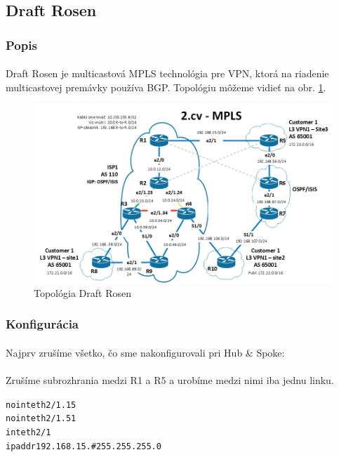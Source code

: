 \documentclass[12pt,twoside,a4paper]{report}
\begin{document}
\subsection{Draft Rosen}
\subsubsection{Popis}
\paragraph{}
Draft Rosen je multicastová MPLS technológia pre VPN, ktorá na riadenie multicastovej premávky používa BGP. Topológiu môžeme vidieť na obr. \ref{fig:mpls_l3vpn_draft_rosen_topo}.

\begin{figure}[!htbp]
\centering
\includegraphics[width=14cm,keepaspectratio]{mpls_l3vpn_topo}
\caption{Topológia Draft Rosen}
\label{fig:mpls_l3vpn_draft_rosen_topo}
\end{figure}

\subsubsection{Konfigurácia}
\paragraph{}
Najprv zrušíme všetko, čo sme nakonfigurovali pri Hub \& Spoke:

\paragraph{}
Zrušíme subrozhrania medzi R1 a R5 a urobíme medzi nimi iba jednu linku.
\noindent
{\selectfont
\begin{small}
\begin{alltt}
no int eth2/1.15
no int eth2/1.51
int eth2/1
ip addr 192.168.15.# 255.255.255.0
\end{alltt}
\end{small}
}
\end{document}
